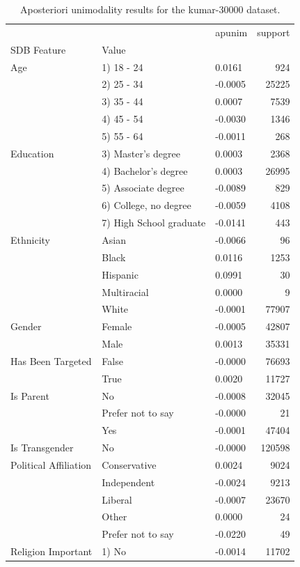 \begin{table}[ht]\centering
\caption{Aposteriori unimodality results for the kumar-30000 dataset.}
\label{tab:kumar-30000}
\begin{tabular}{lllr}
\toprule
 &  & apunim & support \\
SDB Feature & Value &  &  \\
\midrule
Age & 1) 18 - 24 & 0.0161 & 924 \\
 & 2) 25 - 34 & -0.0005 & 25225 \\
 & 3) 35 - 44 & 0.0007 & 7539 \\
 & 4) 45 - 54 & -0.0030 & 1346 \\
 & 5) 55 - 64 & -0.0011 & 268 \\
Education & 3) Master's degree & 0.0003 & 2368 \\
 & 4) Bachelor's degree & 0.0003 & 26995 \\
 & 5) Associate degree & -0.0089 & 829 \\
 & 6) College, no degree & -0.0059 & 4108 \\
 & 7) High School graduate & -0.0141 & 443 \\
Ethnicity & Asian & -0.0066 & 96 \\
 & Black & 0.0116 & 1253 \\
 & Hispanic & 0.0991 & 30 \\
 & Multiracial & 0.0000 & 9 \\
 & White & -0.0001 & 77907 \\
Gender & Female & -0.0005 & 42807 \\
 & Male & 0.0013 & 35331 \\
Has Been Targeted & False & -0.0000 & 76693 \\
 & True & 0.0020 & 11727 \\
Is Parent & No & -0.0008 & 32045 \\
 & Prefer not to say & -0.0000 & 21 \\
 & Yes & -0.0001 & 47404 \\
Is Transgender & No & -0.0000 & 120598 \\
Political Affiliation & Conservative & 0.0024 & 9024 \\
 & Independent & -0.0024 & 9213 \\
 & Liberal & -0.0007 & 23670 \\
 & Other & 0.0000 & 24 \\
 & Prefer not to say & -0.0220 & 49 \\
Religion Important & 1) No & -0.0014 & 11702 \\

\end{tabular}
\end{table}
